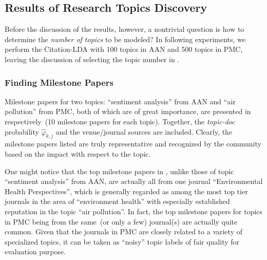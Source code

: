 \subsection{Results of Research Topics Discovery}

Before the discussion of the results, however, a nontrivial question is how to
determine the \emph{number of topics} to be modeled? In following experiments,
we perform the Citation-LDA with 100 topics in AAN and 500 topics in PMC,
leaving the discussion of selecting the topic number in
.

\subsubsection{Finding Milestone Papers}

Milestone papers for two topics: ``sentiment analysis'' from AAN and ``air
pollution'' from PMC, both of which are of great importance, are presented in
 respectively~(10 milestone papers
for each topic). Together, the \emph{topic-doc} probability $\hat\varphi_{k,j}$
and the venue/journal sources are included. Clearly, the milestone papers listed
are truly representative and recognized by the community based on the impact
with respect to the topic.

One might notice that the top milestone papers in ,
unlike those of topic ``sentiment analysis'' from AAN, are actually all from one
journal ``Environmental Health Perspectives'', which is generally regarded as
among the most top tier journals in the area of ``environment health'' with
especially established reputation in the topic ``air pollution''. In fact, the
top milestone papers for topics in PMC being from the same~(or only a few)
journal(s) are actually quite common.  Given that the journals in PMC are
closely related to a variety of specialized topics, it can be taken as ``noisy''
topic labels of fair quality for evaluation purpose.

